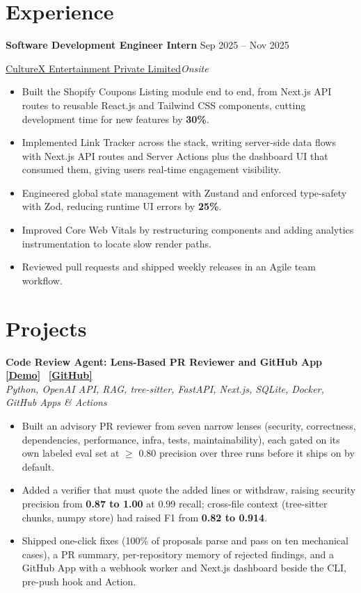 \documentclass[11pt,a4paper,sans]{moderncv}
\begin{document}
\section{Experience}
\textbf{Software Development Engineer Intern} \hfill Sep 2025 -- Nov 2025 \\
{\parfillskip=0pt\relax \href{https://www.culturex.ai/}{CultureX Entertainment Private Limited}\hfill\textit{Onsite}\par}
\begin{itemize}
  \item Built the Shopify Coupons Listing module end to end, from Next.js API routes to reusable React.js and Tailwind CSS components, cutting development time for new features by \textbf{30\%}.
  \item Implemented Link Tracker across the stack, writing server-side data flows with Next.js API routes and Server Actions plus the dashboard UI that consumed them, giving users real-time engagement visibility.
  \item Engineered global state management with Zustand and enforced type-safety with Zod, reducing runtime UI errors by \textbf{25\%}.
  \item Improved Core Web Vitals by restructuring components and adding analytics instrumentation to locate slow render paths.
  \item Reviewed pull requests and shipped weekly releases in an Agile team workflow.
\end{itemize}

\section{Projects}

\textbf{Code Review Agent: Lens-Based PR Reviewer and GitHub App} \hfill \href{https://akashkuushwahaa.vercel.app/code-review-demo.mp4}{\textbf{[Demo]}} \textbar\ \href{https://github.com/akashkuushwahaa/code-review-agent}{\textbf{[GitHub]}} \\
{\small\textit{Python, OpenAI API, RAG, tree-sitter, FastAPI, Next.js, SQLite, Docker, GitHub Apps \& Actions}}
\begin{itemize}
  \item Built an advisory PR reviewer from seven narrow lenses (security, correctness, dependencies, performance, infra, tests, maintainability), each gated on its own labeled eval set at $\geq$ 0.80 precision over three runs before it ships on by default.
  \item Added a verifier that must quote the added lines or withdraw, raising security precision from \textbf{0.87 to 1.00} at 0.99 recall; cross-file context (tree-sitter chunks, numpy store) had raised F1 from \textbf{0.82 to 0.914}.
  \item Shipped one-click fixes (100\% of proposals parse and pass on ten mechanical cases), a PR summary, per-repository memory of rejected findings, and a GitHub App with a webhook worker and Next.js dashboard beside the CLI, pre-push hook and Action.
\end{itemize}
\end{document}
